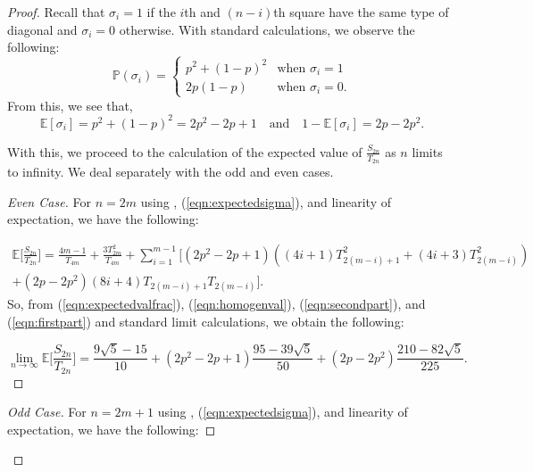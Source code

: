\documentclass{amsart}
\theoremstyle{definition}
\newcommand{\yandi}[1]{\marginpar{\tiny \color{red} Yandi: #1}}
\begin{document}
\begin{proof}
   Recall that $\sigma_i = 1$ if the $i$th and $(n  - i)$th square have the same type of diagonal and $\sigma_i = 0$ otherwise. With standard calculations, we observe the following: 
\[
\mathbb{P}(\sigma_i) = 
\begin{cases} 
p^2 + (1 - p)^2 & \text{when } \sigma_i = 1\\ 
2p(1 - p) & \text{when } \sigma_i = 0 .
\end{cases}
\]
From this, we see that, 
\begin{equation}\label{eqn:expectedsigma}
    \mathbb{E}[\sigma_i] = p^2 + (1 - p)^2 = 2p^2 - 2p + 1
    \quad \text{and} \quad
    1 - \mathbb{E}[\sigma_i] = 2p - 2p^2.
\end{equation}

With this, we proceed to the calculation of the expected value of $\frac{S_{2n}}{T_{2n}}$ as $n$ limits to infinity. We deal separately with the odd and even cases. 

\begin{proof}[Even Case] 
    For $n = 2m$ using , (\ref{eqn:expectedsigma}), and linearity of expectation, we have the following: 

\begin{equation}\label{eqn:expectedvalfrac}
    \begin{split}
\mathbb{E}\bigg[\frac{S_{2n}}{T_{2n}}\bigg] = \frac{4m - 1}{T_{4m} }+ \frac{3T_{2m}^2}{T_{4m}} +\sum_{i=1}^{m-1}[(2p^2 - 2p + 1)((4i+1)T_{2(m-i)+1}^2+(4i+3)T_{2(m-i)}^2) \\
+(2p - 2p^2)(8i+4)T_{2(m-i)+1}T_{2(m-i)}].
\end{split}
\end{equation}
So, from (\ref{eqn:expectedvalfrac}), (\ref{eqn:homogenval}), (\ref{eqn:secondpart}), and (\ref{eqn:firstpart}) and standard limit calculations, we obtain the following: 

\[\lim_{n \to \infty}\mathbb{E}\bigg[\frac{S_{2n}}{T_{2n}}\bigg] = \frac{9\sqrt{5} - 15}{10} + (2p^2 - 2p + 1)\frac{95 - 39\sqrt{5}}{50} + (2p - 2p^2)\frac{210 - 82\sqrt{5}}{225}.\]



\end{proof}

\begin{proof}[Odd Case] 
    For $n = 2m + 1$ using , (\ref{eqn:expectedsigma}), and linearity of expectation, we have the following: 



\end{proof}
\end{proof}
\end{document}
